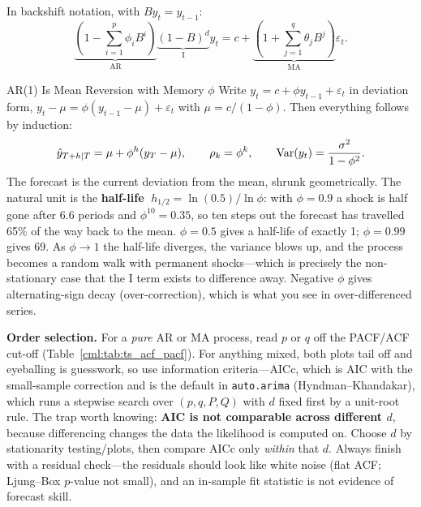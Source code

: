 In backshift notation, with $B y_t = y_{t-1}$:
\begin{equation}
\underbrace{\left(1 - \sum_{i=1}^{p}\phi_i B^i\right)}_{\text{AR}} \underbrace{(1-B)^d}_{\text{I}} y_t = c + \underbrace{\left(1 + \sum_{j=1}^{q}\theta_j B^j\right)}_{\text{MA}} \varepsilon_t .
\end{equation}

\begin{mathresult}{AR(1) Is Mean Reversion with Memory $\phi$}
Write $y_t = c + \phi y_{t-1} + \varepsilon_t$ in deviation form, $y_t - \mu = \phi(y_{t-1}-\mu) + \varepsilon_t$ with $\mu = c/(1-\phi)$. Then everything follows by induction:
\begin{equation}
\hat{y}_{T+h|T} = \mu + \phi^h (y_T - \mu), \qquad \rho_k = \phi^k, \qquad \operatorname{Var}(y_t) = \frac{\sigma^2}{1-\phi^2}.
\end{equation}
The forecast is the current deviation from the mean, shrunk geometrically. The natural unit is the \textbf{half-life} $\;h_{1/2} = \ln(0.5)/\ln\phi$: with $\phi = 0.9$ a shock is half gone after $6.6$ periods and $\phi^{10} = 0.35$, so ten steps out the forecast has travelled 65\% of the way back to the mean. $\phi = 0.5$ gives a half-life of exactly 1; $\phi = 0.99$ gives 69. As $\phi \to 1$ the half-life diverges, the variance blows up, and the process becomes a random walk with permanent shocks---which is precisely the non-stationary case that the I term exists to difference away. Negative $\phi$ gives alternating-sign decay (over-correction), which is what you see in over-differenced series.
\end{mathresult}

\textbf{Order selection.} For a \emph{pure} AR or MA process, read $p$ or $q$ off the PACF/ACF cut-off (Table~\ref{cml:tab:ts_acf_pacf}). For anything mixed, both plots tail off and eyeballing is guesswork, so use information criteria---AICc, which is AIC with the small-sample correction and is the default in \texttt{auto.arima} (Hyndman--Khandakar), which runs a stepwise search over $(p,q,P,Q)$ with $d$ fixed first by a unit-root rule. The trap worth knowing: \textbf{AIC is not comparable across different $d$}, because differencing changes the data the likelihood is computed on. Choose $d$ by stationarity testing/plots, then compare AICc only \emph{within} that $d$. Always finish with a residual check---the residuals should look like white noise (flat ACF; Ljung--Box $p$-value not small), and an in-sample fit statistic is not evidence of forecast skill.

